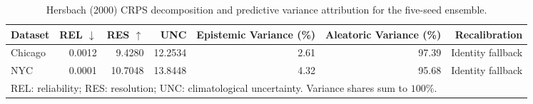 \begin{table}[htbp]
  \centering
  \caption{Hersbach (2000) CRPS decomposition and predictive variance attribution for the five-seed ensemble.}
  \label{tab:uncertainty}
  \begin{tabular}{l r r r r r r}
    \toprule
    \textbf{Dataset} & \textbf{REL $\downarrow$} & \textbf{RES $\uparrow$} & \textbf{UNC} & \textbf{Epistemic Variance (\%)} & \textbf{Aleatoric Variance (\%)} & \textbf{Recalibration} \\
    \midrule
    Chicago & 0.0012 & 9.4280 & 12.2534 & 2.61 & 97.39 & Identity fallback \\
    NYC & 0.0001 & 10.7048 & 13.8448 & 4.32 & 95.68 & Identity fallback \\
    \midrule
    \multicolumn{7}{l}{\footnotesize REL: reliability; RES: resolution; UNC: climatological uncertainty. Variance shares sum to $100\%$.} \\
    \bottomrule
  \end{tabular}
\end{table}